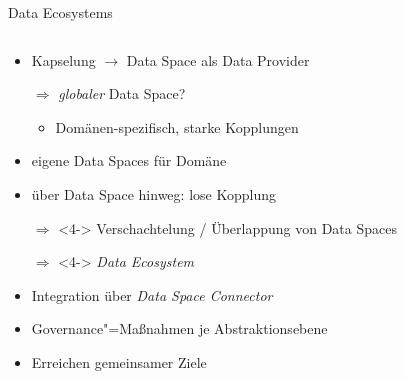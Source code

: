 \begin{frame}{Data Ecosystems \footnotesize\cite{mollerIndustrialDataEcosystems2024}}
    \begin{columns}
        \begin{column}{0.6\textwidth}
            \begin{itemize}
                \item Kapselung $\to$ Data Space als Data Provider
                
                \item[$\Rightarrow$] \emph{globaler} Data Space?
                \begin{itemize}
                    \item<2-> Domänen-spezifisch, starke Kopplungen
                \end{itemize}

                \item<3-> eigene Data Spaces für Domäne
                \item<3-> über Data Space hinweg: lose Kopplung

                \item[$\Rightarrow$]<4-> Verschachtelung / Überlappung von Data Spaces
                \item[$\Rightarrow$]<4-> \alert{\emph{Data Ecosystem}}
                

                \item<5-> Integration über \emph{Data Space Connector}
                \item<5-> Governance"=Maßnahmen je Abstraktionsebene
                \item<5-> Erreichen gemeinsamer Ziele
            \end{itemize}
        \end{column}


\end{columns}
\end{frame}
